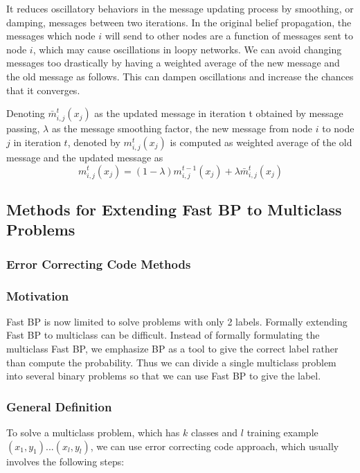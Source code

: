 It reduces oscillatory behaviors in the message updating process by smoothing, or damping, messages between two iterations. In the original belief propagation, the messages which node $i$ will send to other nodes are a function of messages sent to node $i$, which may cause oscillations in loopy networks. We can avoid changing messages too drastically by having a weighted average of the new message and the old message as follows. This can dampen oscillations and increase the chances that it converges.

Denoting $\bar{m}_{i,j}^{t}(x_{j})$ as the updated message in iteration t obtained by message passing, $\lambda$ as the message smoothing factor, the new message from node $i$ to node $j$ in iteration $t$, denoted by $m_{i,j}^{t}(x_{j})$ is computed as weighted average of the old message and the updated message as
\begin{equation}
    m_{i,j}^{t}(x_{j}) = (1-\lambda)m_{i,j}^{t-1}(x_{j}) + \lambda\bar{m}_{i,j}^{t}(x_{j})
\end{equation}

\subsection{Methods for Extending Fast BP to Multiclass Problems}

\subsubsection{Error Correcting Code Methods}

\subsubsection*{Motivation}
Fast BP is now limited to solve problems with only 2 labels. Formally extending Fast BP to multiclass can be difficult. Instead of formally formulating the multiclass Fast BP, we emphasize BP as a tool to give the correct label rather than compute the probability. Thus we can divide a single multiclass problem into several binary problems so that we can use Fast BP to give the label.


\subsubsection*{General Definition}

To solve a multiclass problem, which has $k$ classes and $l$ training example $(x_{1},y_{1})...(x_{l},y_{l})$, we can use error correcting code approach, which usually involves the following steps:

